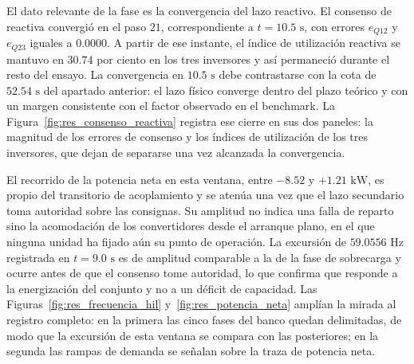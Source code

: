 El dato relevante de la fase es la convergencia del lazo reactivo. El consenso de reactiva convergió en el paso $21$, correspondiente a $t = 10.5\text{ s}$, con errores $e_{Q12}$ y $e_{Q23}$ iguales a $0.0000$. A partir de ese instante, el índice de utilización reactiva se mantuvo en $30.74$ por ciento en los tres inversores y así permaneció durante el resto del ensayo. La convergencia en $10.5\text{ s}$ debe contrastarse con la cota de $52.54\text{ s}$ del apartado anterior: el lazo físico converge dentro del plazo teórico y con un margen consistente con el factor observado en el benchmark. La Figura~\ref{fig:res_consenso_reactiva} registra ese cierre en sus dos paneles: la magnitud de los errores de consenso y los índices de utilización de los tres inversores, que dejan de separarse una vez alcanzada la convergencia.

El recorrido de la potencia neta en esta ventana, entre $-8.52$ y $+1.21\text{ kW}$, es propio del transitorio de acoplamiento y se atenúa una vez que el lazo secundario toma autoridad sobre las consignas. Su amplitud no indica una falla de reparto sino la acomodación de los convertidores desde el arranque plano, en el que ninguna unidad ha fijado aún su punto de operación. La excursión de $59.0556\text{ Hz}$ registrada en $t = 9.0\text{ s}$ es de amplitud comparable a la de la fase de sobrecarga y ocurre antes de que el consenso tome autoridad, lo que confirma que responde a la energización del conjunto y no a un déficit de capacidad. Las Figuras~\ref{fig:res_frecuencia_hil} y~\ref{fig:res_potencia_neta} amplían la mirada al registro completo: en la primera las cinco fases del banco quedan delimitadas, de modo que la excursión de esta ventana se compara con las posteriores; en la segunda las rampas de demanda se señalan sobre la traza de potencia neta.

